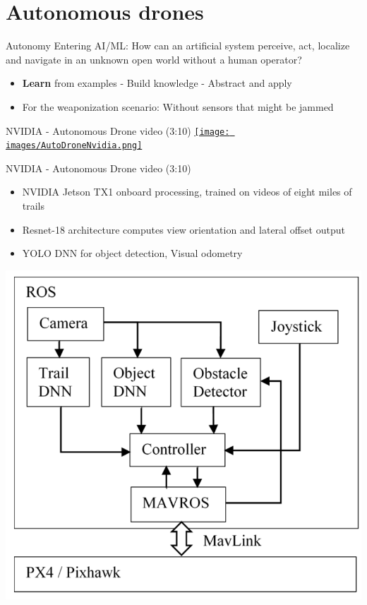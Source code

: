 \documentclass[aspectratio=169]{beamer}
\begin{document}
\section{Autonomous drones}
\begin{frame}{Autonomy}
	Entering AI/ML: How can an artificial system perceive, act, localize and navigate in an unknown open world without a human operator?
	\begin{itemize}
		\item \textbf{Learn} from examples - Build knowledge - Abstract and apply
		\item For the weaponization scenario: Without sensors that might be jammed
	\end{itemize}
\end{frame}

\begin{frame}{NVIDIA - Autonomous Drone video (3:10)}
        	\centering
            \href{run:./videos/AutoDroneNvidia.mp4?autostart}
            {\texttt{[image: images/AutoDroneNvidia.png]}}
\end{frame}

\begin{frame}{NVIDIA - Autonomous Drone video (3:10)}
	\begin{itemize}
		\item NVIDIA Jetson TX1 onboard processing, trained on videos of eight miles of trails
		\item Resnet-18 architecture computes view orientation and lateral offset output
		\item YOLO DNN for object detection, Visual odometry
	\end{itemize}
	\centering
	\includegraphics[width=.4\textwidth]{images/nvidia_controller.png}
	
	\tiny{\color{gray}{https://arxiv.org/pdf/1705.02550.pdf}}
	
\end{frame}
\end{document}
